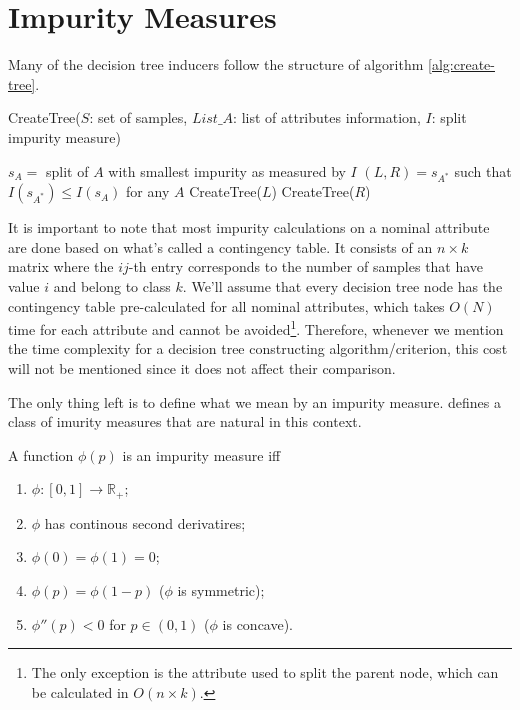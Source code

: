 \section{Impurity Measures}
Many of the decision tree inducers follow the structure of algorithm \ref{alg:create-tree}.

\begin{algorithm}[tb]
   \caption{CreateTree($S$: set of samples, $List\_A$: list of attributes information, $I$: split impurity measure)}
   \label{alg:create-tree}
\begin{algorithmic}
\STATE $s_A = $ split of $A$ with smallest impurity as measured by $I$
\ENDFOR
\STATE $(L, R) = s_{A^*}$ such that $I(s_{A^*}) \leq I(s_A) $ for any $A$
\STATE CreateTree($L$)
\STATE CreateTree($R$)
\ENDIF
\end{algorithmic}
\end{algorithm}

It is important to note that most impurity calculations on a nominal attribute are done based on what's called a contingency table. It consists of an $n\times k$ matrix where the $ij$-th entry corresponds to the number of samples that have value $i$ and belong to class $k$. We'll assume that every decision tree node has the contingency table pre-calculated for all nominal attributes, which takes $O(N)$ time for each attribute and cannot be avoided\footnote{The only exception is the attribute used to split the parent node, which can be calculated in $O(n\times k)$.}. Therefore, whenever we mention the time complexity for a decision tree constructing algorithm/criterion, this cost will not be mentioned since it does not affect their comparison.

The only thing left is to define what we mean by an impurity measure. \cite{Breiman84} defines a class of imurity measures that are natural in this context.

\begin{definition}
 A function $\phi(p)$ is an impurity measure iff 
 \begin{enumerate}
  \item $\phi: [0, 1] \rightarrow \mathbb{R}_+$;
  \item $\phi$ has continous second derivatires;
  \item $\phi(0) = \phi(1) = 0$;
  \item $\phi(p) = \phi(1-p)$ ($\phi$ is symmetric);
  \item $\phi''(p) < 0$ for $p \in (0, 1)$ ($\phi$ is concave).
 \end{enumerate}
\end{definition}

